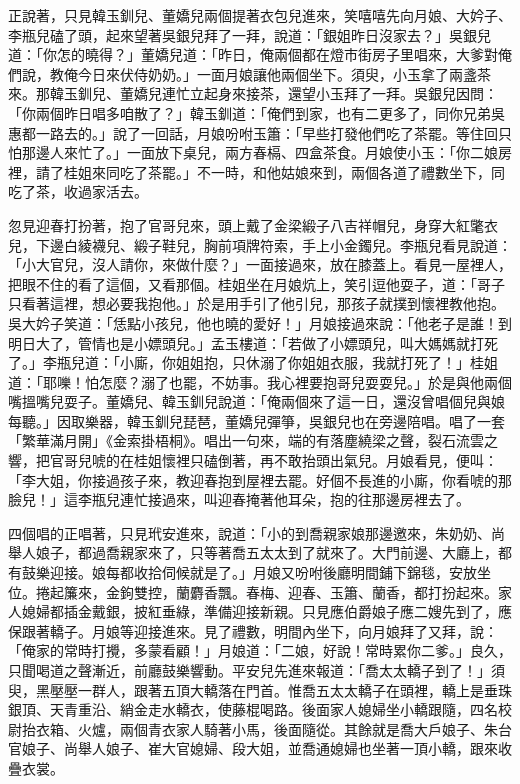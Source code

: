 正說著，只見韓玉釧兒、董嬌兒兩個提著衣包兒進來，笑嘻嘻先向月娘、大妗子、李瓶兒磕了頭，起來望著吳銀兒拜了一拜，說道：「銀姐昨日沒家去？」吳銀兒道：「你怎的曉得？」董嬌兒道：「昨日，俺兩個都在燈市街房子里唱來，大爹對俺們說，教俺今日來伏侍奶奶。」一面月娘讓他兩個坐下。須臾，小玉拿了兩盞茶來。那韓玉釧兒、董嬌兒連忙立起身來接茶，還望小玉拜了一拜。吳銀兒因問：「你兩個昨日唱多咱散了？」韓玉釧道：「俺們到家，也有二更多了，同你兄弟吳惠都一路去的。」說了一回話，月娘吩咐玉簫：「早些打發他們吃了茶罷。等住回只怕那邊人來忙了。」一面放下桌兒，兩方春槅、四盒茶食。月娘使小玉：「你二娘房裡，請了桂姐來同吃了茶罷。」不一時，和他姑娘來到，兩個各道了禮數坐下，同吃了茶，收過家活去。

忽見迎春打扮著，抱了官哥兒來，頭上戴了金梁緞子八吉祥帽兒，身穿大紅氅衣兒，下邊白綾襪兒、緞子鞋兒，胸前項牌符索，手上小金鐲兒。李瓶兒看見說道： 「小大官兒，沒人請你，來做什麼？」一面接過來，放在膝蓋上。看見一屋裡人，把眼不住的看了這個，又看那個。桂姐坐在月娘炕上，笑引逗他耍子，道：「哥子只看著這裡，想必要我抱他。」於是用手引了他引兒，那孩子就撲到懷裡教他抱。吳大妗子笑道：「恁點小孩兒，他也曉的愛好！」月娘接過來說：「他老子是誰！到明日大了，管情也是小嫖頭兒。」孟玉樓道：「若做了小嫖頭兒，叫大媽媽就打死了。」李瓶兒道：「小廝，你姐姐抱，只休溺了你姐姐衣服，我就打死了！」桂姐道：「耶嚛！怕怎麼？溺了也罷，不妨事。我心裡要抱哥兒耍耍兒。」於是與他兩個嘴搵嘴兒耍子。董嬌兒、韓玉釧兒說道：「俺兩個來了這一日，還沒曾唱個兒與娘每聽。」因取樂器，韓玉釧兒琵琶，董嬌兒彈箏，吳銀兒也在旁邊陪唱。唱了一套「繁華滿月開」《金索掛梧桐》。唱出一句來，端的有落塵繞梁之聲，裂石流雲之響，把官哥兒唬的在桂姐懷裡只磕倒著，再不敢抬頭出氣兒。月娘看見，便叫：「李大姐，你接過孩子來，教迎春抱到屋裡去罷。好個不長進的小廝，你看唬的那臉兒！」這李瓶兒連忙接過來，叫迎春掩著他耳朵，抱的往那邊房裡去了。

四個唱的正唱著，只見玳安進來，說道：「小的到喬親家娘那邊邀來，朱奶奶、尚舉人娘子，都過喬親家來了，只等著喬五太太到了就來了。大門前邊、大廳上，都有鼓樂迎接。娘每都收拾伺候就是了。」月娘又吩咐後廳明間鋪下錦毯，安放坐位。捲起簾來，金鉤雙控，蘭麝香飄。春梅、迎春、玉簫、蘭香，都打扮起來。家人媳婦都插金戴銀，披紅垂綠，準備迎接新親。只見應伯爵娘子應二嫂先到了，應保跟著轎子。月娘等迎接進來。見了禮數，明間內坐下，向月娘拜了又拜，說：「俺家的常時打攪，多蒙看顧！」月娘道：「二娘，好說！常時累你二爹。」良久，只聞喝道之聲漸近，前廳鼓樂響動。平安兒先進來報道：「喬太太轎子到了！」須臾，黑壓壓一群人，跟著五頂大轎落在門首。惟喬五太太轎子在頭裡，轎上是垂珠銀頂、天青重沿、綃金走水轎衣，使藤棍喝路。後面家人媳婦坐小轎跟隨，四名校尉抬衣箱、火爐，兩個青衣家人騎著小馬，後面隨從。其餘就是喬大戶娘子、朱台官娘子、尚舉人娘子、崔大官媳婦、段大姐，並喬通媳婦也坐著一頂小轎，跟來收疊衣裳。

